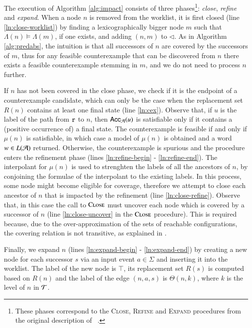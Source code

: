 \documentclass[10pt,conference,letterpaper,twocolumn]{IEEEtran}
\begin{document}
The execution of Algorithm \ref{alg:impact} consists of three
phases\footnote{These phases correspond to the \textsc{Close},
  \textsc{Refine} and \textsc{Expand} procedures from the original
  description of \impact~\cite{mcmillan06}.}: \emph{close},
\emph{refine} and \emph{expand}. When a node $n$ is removed from the
worklist, it is first closed (line \ref{ln:close-worklist}) by finding
a lexicographically bigger node $m$ such that $\Lambda(n) \models
\Lambda(m)$, if one exists, and adding $(n,m)$ to $\lhd$. As in
Algorithm \ref{alg:predabs}, the intuition is that all successors of
$n$ are covered by the successors of $m$, thus for any feasible
counterexample that can be discovered from $n$ there exists a feasible
counterexample stemming in $m$, and we do not need to process $n$
further. 

If $n$ has not been covered in the close phase, we check if it is the
endpoint of a counterexample candidate, which can only be the case
when the replacement set $R(n)$ contains at least one final state
(line \ref{ln:cex}). Observe that, if $u$ is the label of the path
from $\mathtt{r}$ to $n$, then $\mathsf{Acc}_{\mathcal{A}}(u)$ is satisfiable only if
it contains a (positive occurrence of) a final state. The
counterexample is feasible if and only if $\mu(n)$ is satisfiable, in
which case a model of $\mu(n)$ is obtained and a word $w \in L(\mathcal{A})$
returned. Otherwise, the counterexample is spurious and the procedure
enters the refinement phase (lines \ref{ln:refine-begin} -
\ref{ln:refine-end}). The interpolant for $\mu(n)$ is used to
strenghten the labels of all the ancestors of $n$, by conjoining the
formulae of the interpolant to the existing labels. In this process,
some node might become eligible for coverage, therefore we attempt to
close each ancestor of $n$ that is impacted by the refinement (line
\ref{ln:close-refine}). Observe that, in this case the call to
$\Call{Close}{}$ must uncover each node which is covered by a
successor of $n$ (line \ref{ln:close-uncover} in the $\Call{Close}{}$
procedure). This is required because, due to the over-approximation of
the sets of reachable configurations, the covering relation is not
transitive, as explained in \cite{mcmillan06}. 

Finally, we expand $n$ (lines \ref{ln:expand-begin} -
\ref{ln:expand-end}) by creating a new node for each successor $s$ via
an input event $a \in \Sigma$ and inserting it into the worklist. The
label of the new node is $\top$, its replacement set $R(s)$ is
computed based on $R(n)$ and the label of the edge $(n,a,s)$ is
$\Theta(n,k)$, where $k$ is the level of $n$ in $\mathcal{T}$.

 

\end{document}
